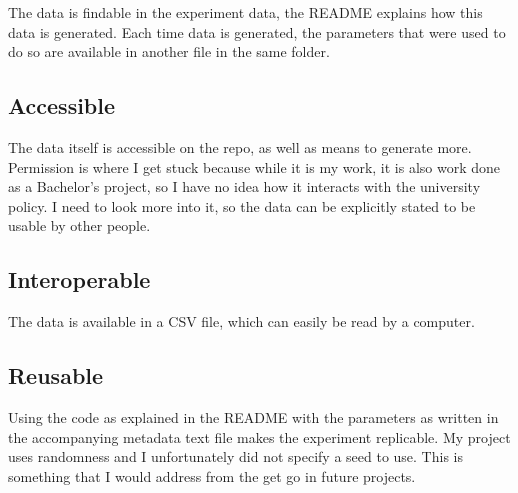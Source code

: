 \documentclass{article}
\begin{document}
The data is findable in the experiment data, the README explains how this data is generated. Each time data is generated, the parameters that were used to do so are available in another file in the same folder.

\subsection*{Accessible}

The data itself is accessible on the repo, as well as means to generate more. Permission is where I get stuck because while it is my work, it is also work done as a Bachelor's project, so I have no idea how it interacts with the university policy. I need to look more into it, so the data can be explicitly stated to be usable by other people.


\subsection*{Interoperable}

The data is available in a CSV file, which can easily be read by a computer. 

\subsection*{Reusable}

Using the code as explained in the README with the parameters as written in the accompanying metadata text file makes the experiment replicable. My project uses randomness and I unfortunately did not specify a seed to use. This is something that I would address from the get go in future projects.
\end{document}
